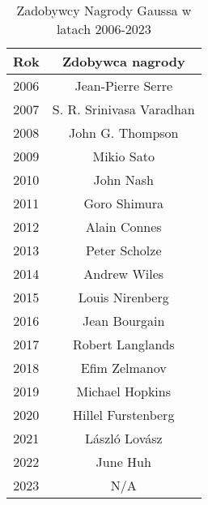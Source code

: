 \begin{table}[ht]
    \centering
    \begin{tabular}{|c|c|}
    \hline
    Rok & Zdobywca nagrody              \\
    \hline
    2006 & Jean-Pierre Serre            \\
    \hline
    2007 & S. R. Srinivasa Varadhan     \\
    \hline
    2008 & John G. Thompson             \\
    \hline
    2009 & Mikio Sato                   \\
    \hline
    2010 & John Nash                    \\
    \hline
    2011 & Goro Shimura                 \\
    \hline
    2012 & Alain Connes                 \\
    \hline
    2013 & Peter Scholze                \\
    \hline
    2014 & Andrew Wiles                 \\
    \hline
    2015 & Louis Nirenberg              \\
    \hline
    2016 & Jean Bourgain                \\
    \hline
    2017 & Robert Langlands             \\
    \hline
    2018 & Efim Zelmanov                \\
    \hline
    2019 & Michael Hopkins              \\
    \hline
    2020 & Hillel Furstenberg           \\
    \hline
    2021 & László Lovász                \\
    \hline
    2022 & June Huh                     \\
    \hline
    2023 & N/A                          \\
    \hline
    \end{tabular}
    \caption{Zadobywcy Nagrody Gaussa w latach 2006-2023}
    \label{tab:gauss}
\end{table}